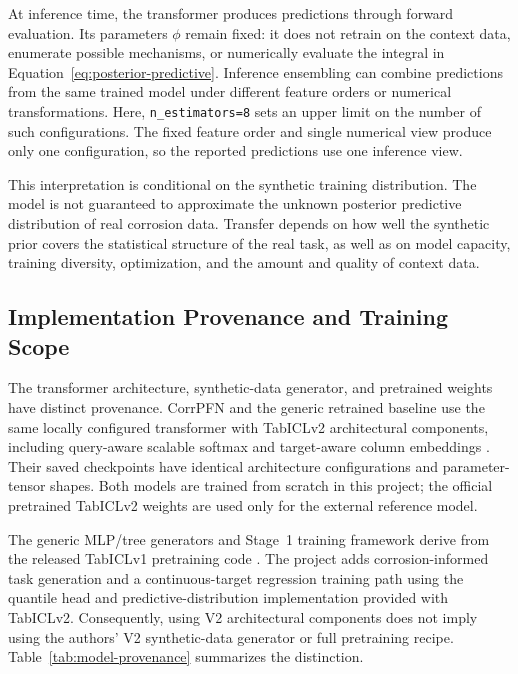 \documentclass{article}
\begin{document}
At inference time, the transformer produces predictions through forward
evaluation. Its parameters \(\phi\) remain fixed: it does not retrain on the
context data, enumerate possible mechanisms, or numerically evaluate the
integral in Equation~\eqref{eq:posterior-predictive}. Inference ensembling can
combine predictions from the same trained model under different feature
orders or numerical transformations. Here, \texttt{n\_estimators=8} sets an
upper limit on the number of such configurations. The fixed feature order
and single numerical view produce only one configuration, so the reported
predictions use one inference view.

This interpretation is conditional on the synthetic training distribution.
The model is not guaranteed to approximate the unknown posterior predictive
distribution of real corrosion data. Transfer depends on how well the
synthetic prior covers the statistical structure of the real task, as well as
on model capacity, training diversity, optimization, and the amount and
quality of context data.

\subsection{Implementation Provenance and Training Scope}
\label{sec:implementation-provenance}

The transformer architecture, synthetic-data generator, and pretrained weights
have distinct provenance. CorrPFN and the generic retrained baseline use the
same locally configured transformer with TabICLv2 architectural components,
including query-aware scalable softmax and target-aware column embeddings
\cite{qu2026tabiclv2}. Their saved checkpoints have identical architecture
configurations and parameter-tensor shapes. Both models are trained from
scratch in this project; the official pretrained TabICLv2 weights are used
only for the external reference model.

The generic MLP/tree generators and Stage~1 training framework derive from
the released TabICLv1 pretraining code \cite{qu2025tabicl}. The project adds
corrosion-informed task generation and a continuous-target regression training
path using the quantile head and predictive-distribution implementation
provided with TabICLv2. Consequently, using V2 architectural components does
not imply using the authors' V2 synthetic-data generator or full pretraining
recipe. Table~\ref{tab:model-provenance} summarizes the distinction.
\end{document}
